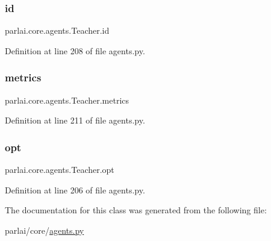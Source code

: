 \subsubsection{\texorpdfstring{id}{id}}
{\footnotesize\ttfamily parlai.\+core.\+agents.\+Teacher.\+id}



Definition at line 208 of file agents.\+py.

\mbox{\label{classparlai_1_1core_1_1agents_1_1Teacher_a159705efe2a9f389d8adfdad76891f08}} 
\subsubsection{\texorpdfstring{metrics}{metrics}}
{\footnotesize\ttfamily parlai.\+core.\+agents.\+Teacher.\+metrics}



Definition at line 211 of file agents.\+py.

\mbox{\label{classparlai_1_1core_1_1agents_1_1Teacher_a3ce6243860ce978a897922863ed32fa4}} 
\subsubsection{\texorpdfstring{opt}{opt}}
{\footnotesize\ttfamily parlai.\+core.\+agents.\+Teacher.\+opt}



Definition at line 206 of file agents.\+py.



The documentation for this class was generated from the following file\+:\begin{DoxyCompactItemize}
\item 
parlai/core/\hyperlink{parlai_2core_2agents_8py}{agents.\+py}\end{DoxyCompactItemize}
